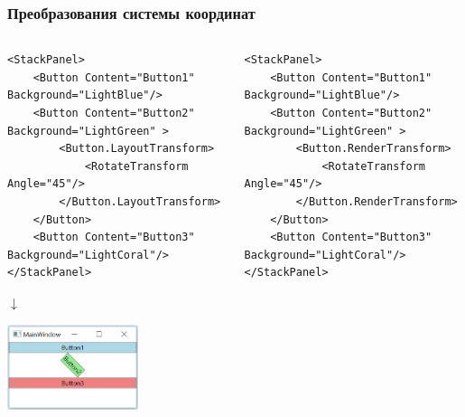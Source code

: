 \documentclass[xetex,mathserif,serif]{beamer}
\newcommand{\DownArrow} {
    \hspace{2cm}\begin{LARGE}$\downarrow$\end{LARGE}
}
\begin{document}
    \begin{frame}[fragile]
        \frametitle{Преобразования системы координат}
        \begin{columns}
            \begin{column}{0.5\textwidth}
                \begin{tiny}
                    \begin{verbatim}
<StackPanel>
    <Button Content="Button1" Background="LightBlue"/>
    <Button Content="Button2" Background="LightGreen" >
        <Button.LayoutTransform>
            <RotateTransform Angle="45"/>
        </Button.LayoutTransform>
    </Button>
    <Button Content="Button3" Background="LightCoral"/>
</StackPanel>
                    \end{verbatim}
                \end{tiny}

                \DownArrow
                \begin{center}
                    \includegraphics[width=0.6\textwidth]{layoutTransform.png}
                \end{center}
            \end{column}
            \begin{column}{0.5\textwidth}
                \begin{tiny}
                    \begin{verbatim}
<StackPanel>
    <Button Content="Button1" Background="LightBlue"/>
    <Button Content="Button2" Background="LightGreen" >
        <Button.RenderTransform>
            <RotateTransform Angle="45"/>
        </Button.RenderTransform>
    </Button>
    <Button Content="Button3" Background="LightCoral"/>
</StackPanel>
                    \end{verbatim}
                \end{tiny}


\end{column}
\end{columns}
\end{frame}
\end{document}

